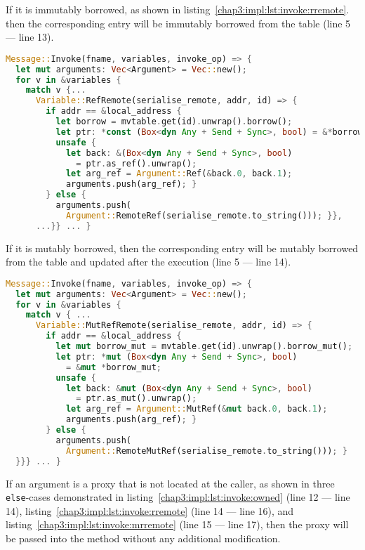 If it is immutably borrowed, as shown in listing~\ref{chap3:impl:lst:invoke:rremote}. then the corresponding entry will be immutably borrowed from the table (line 5 --- line 13).
\begin{lstlisting}[language=Rust, style=boxed, basicstyle=\footnotesize\ttfamily, caption={Gathering variables from an invocation message: \lstinline{RefRemote}}, label=chap3:impl:lst:invoke:rremote]
Message::Invoke(fname, variables, invoke_op) => {
  let mut arguments: Vec<Argument> = Vec::new();
  for v in &variables {
    match v {...
      Variable::RefRemote(serialise_remote, addr, id) => {
        if addr == &local_address {
          let borrow = mvtable.get(id).unwrap().borrow();
          let ptr: *const (Box<dyn Any + Send + Sync>, bool) = &*borrow;
          unsafe {
            let back: &(Box<dyn Any + Send + Sync>, bool) 
              = ptr.as_ref().unwrap();
            let arg_ref = Argument::Ref(&back.0, back.1);
            arguments.push(arg_ref); }
        } else { 
          arguments.push(
            Argument::RemoteRef(serialise_remote.to_string())); }},
      ...}} ... }
\end{lstlisting}

 If it is mutably borrowed, then the corresponding entry will be mutably borrowed from the table and updated after the execution (line 5 --- line 14). 
\begin{lstlisting}[language=Rust, style=boxed, basicstyle=\footnotesize\ttfamily, caption={Gathering variables from an invocation message: \lstinline{MutRefRemote}}, label=chap3:impl:lst:invoke:mrremote]
Message::Invoke(fname, variables, invoke_op) => {
  let mut arguments: Vec<Argument> = Vec::new();
  for v in &variables {
    match v { ...
      Variable::MutRefRemote(serialise_remote, addr, id) => {
        if addr == &local_address {
          let mut borrow_mut = mvtable.get(id).unwrap().borrow_mut();
          let ptr: *mut (Box<dyn Any + Send + Sync>, bool)
            = &mut *borrow_mut;
          unsafe {
            let back: &mut (Box<dyn Any + Send + Sync>, bool) 
              = ptr.as_mut().unwrap();
            let arg_ref = Argument::MutRef(&mut back.0, back.1);
            arguments.push(arg_ref); }
        } else { 
          arguments.push(
            Argument::RemoteMutRef(serialise_remote.to_string())); }
  }}} ... }
\end{lstlisting}

If an argument is a proxy that is not located at the caller, as shown in three \lstinline{else}-cases demonstrated in listing~\ref{chap3:impl:lst:invoke:owned} (line 12 --- line 14), listing~\ref{chap3:impl:lst:invoke:rremote} (line 14 --- line 16), and listing~\ref{chap3:impl:lst:invoke:mrremote} (line 15 --- line 17), then the proxy will be passed into the method without any additional modification.

